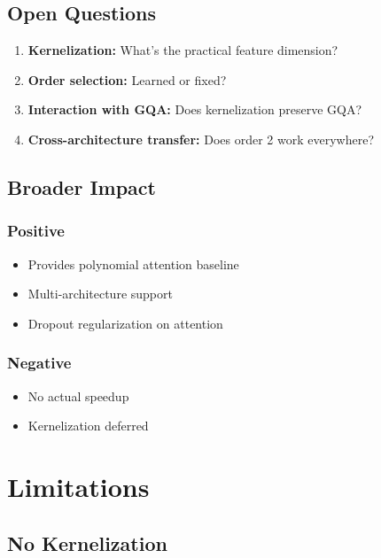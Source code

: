 \subsection{Open Questions}

\begin{enumerate}
\item \textbf{Kernelization:} What's the practical feature dimension?
\item \textbf{Order selection:} Learned or fixed?
\item \textbf{Interaction with GQA:} Does kernelization preserve GQA?
\item \textbf{Cross-architecture transfer:} Does order 2 work everywhere?

\end{enumerate}
\subsection{Broader Impact}

\subsubsection{Positive}
\begin{itemize}
\item Provides polynomial attention baseline
\item Multi-architecture support
\item Dropout regularization on attention

\end{itemize}
\subsubsection{Negative}
\begin{itemize}
\item No actual speedup
\item Kernelization deferred

\end{itemize}


\section{Limitations}

\subsection{No Kernelization}

